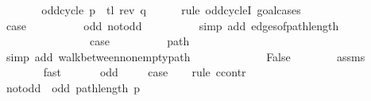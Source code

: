 \begin{isabellebody}
\ \ \ \ \isamarkupfalse%
\ \isamarkupfalse%
\ {\isachardoublequoteopen}odd{\isacharunderscore}{\kern0pt}cycle\ {\isacharparenleft}{\kern0pt}p\ {\isacharat}{\kern0pt}\ tl\ {\isacharparenleft}{\kern0pt}rev\ q{\isacharparenright}{\kern0pt}{\isacharparenright}{\kern0pt}{\isachardoublequoteclose}\isanewline
\ \ \ \ \isamarkupfalse%
\ {\isacharparenleft}{\kern0pt}rule\ odd{\isacharunderscore}{\kern0pt}cycleI{\isacharcomma}{\kern0pt}\ goal{\isacharunderscore}{\kern0pt}cases{\isacharparenright}{\kern0pt}\isanewline
\ \ \ \ \ \ \isamarkupfalse%
\ {}\isanewline
\ \ \ \ \ \ \isamarkupfalse%
\ {\isacharquery}{\kern0pt}case\isanewline
\ \ \ \ \ \ \ \ \isamarkupfalse%
\ odd\ not{\isacharunderscore}{\kern0pt}odd\isanewline
\ \ \ \ \ \ \ \ \isamarkupfalse%
\ {\isacharparenleft}{\kern0pt}simp\ add{\isacharcolon}{\kern0pt}\ edges{\isacharunderscore}{\kern0pt}of{\isacharunderscore}{\kern0pt}path{\isacharunderscore}{\kern0pt}length{\isacharparenright}{\kern0pt}\isanewline
\ \ \ \ \isamarkupfalse%
\isanewline
\ \ \ \ \ \ \isamarkupfalse%
\ {}\isanewline
\ \ \ \ \ \ \isamarkupfalse%
\ {\isacharquery}{\kern0pt}case\isanewline
\ \ \ \ \ \ \ \ \isamarkupfalse%
\ path\isanewline
\ \ \ \ \ \ \ \ \isamarkupfalse%
\ {\isacharparenleft}{\kern0pt}simp\ add{\isacharcolon}{\kern0pt}\ walk{\isacharunderscore}{\kern0pt}between{\isacharunderscore}{\kern0pt}nonempty{\isacharunderscore}{\kern0pt}path{\isacharparenleft}{\kern0pt}{}{\isacharcomma}{\kern0pt}\ {}{\isacharparenright}{\kern0pt}{\isacharparenright}{\kern0pt}\isanewline
\ \ \ \ \isamarkupfalse%
\isanewline
\ \ \ \ \isamarkupfalse%
\ \isamarkupfalse%
\ False\isanewline
\ \ \ \ \ \ \isamarkupfalse%
\ assms{\isacharparenleft}{\kern0pt}{}{\isacharparenright}{\kern0pt}\isanewline
\ \ \ \ \ \ \isamarkupfalse%
\ fast\isanewline
\ \ \isamarkupfalse%
\isanewline
{}\isamarkupfalse%
\isanewline
\ \ \isamarkupfalse%
\ odd{\isacharcolon}{\kern0pt}\ {}\isanewline
\ \ \isamarkupfalse%
\ {\isacharquery}{\kern0pt}case\isanewline
\ \ \isamarkupfalse%
\ {\isacharparenleft}{\kern0pt}rule\ ccontr{\isacharparenright}{\kern0pt}\isanewline
\ \ \isamarkupfalse%
\ not{\isacharunderscore}{\kern0pt}odd{\isacharcolon}{\kern0pt}\ {\isachardoublequoteopen}{\isasymnot}\ odd\ {\isacharparenleft}{\kern0pt}path{\isacharunderscore}{\kern0pt}length\ p{\isacharparenright}{\kern0pt}{\isachardoublequoteclose}\isanewline

\end{isabellebody}
